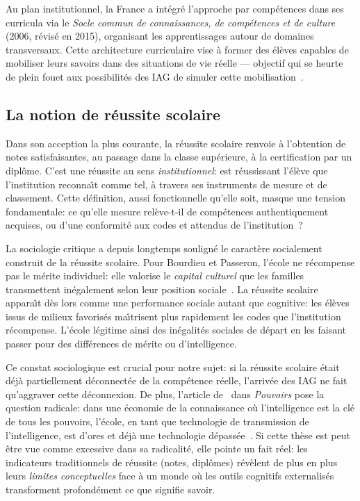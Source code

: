 Au plan institutionnel, la France a int\'egr\'e l'approche par comp\'etences dans ses curricula via le \emph{Socle commun de connaissances, de comp\'etences et de culture} (2006, r\'evis\'e en 2015), organisant les apprentissages autour de domaines transversaux. 
Cette architecture curriculaire vise \`a former des \'el\`eves capables de mobiliser leurs savoirs dans des situations de vie r\'eelle --- objectif qui se heurte de plein fouet aux possibilit\'es des IAG de simuler cette mobilisation~\citep{leroux2015evaluer}.

\subsection{La notion de r\'eussite scolaire}

Dans son acception la plus courante, la r\'eussite scolaire renvoie \`a l'obtention de notes satisfaisantes, au passage dans la classe sup\'erieure, \`a la certification par un dipl\^ome.
C'est une r\'eussite au sens \emph{institutionnel}: est r\'eussissant l'\'el\`eve que l'institution reconna\^\i t comme tel, \`a travers ses instruments de mesure et de classement.
Cette d\'efinition, aussi fonctionnelle qu'elle soit, masque une tension fondamentale: ce qu'elle mesure rel\`eve-t-il de comp\'etences authentiquement acquises, ou d'une conformit\'e aux codes et attendus de l'institution~?

La sociologie critique a depuis longtemps soulign\'e le caract\`ere socialement construit de la r\'eussite scolaire. 
Pour Bourdieu et Passeron, l'\'ecole ne r\'ecompense pas le m\'erite individuel: elle valorise le \emph{capital culturel} que les familles transmettent in\'egalement selon leur position sociale~\citep{pluet1971pierre}. 
La r\'eussite scolaire appara\^\i t d\`es lors comme une performance sociale autant que cognitive: les \'el\`eves issus de milieux favoris\'es ma\^\i trisent plus rapidement les codes que l'institution r\'ecompense. 
L'\'ecole l\'egitime ainsi des in\'egalit\'es sociales de d\'epart en les faisant passer pour des diff\'erences de m\'erite ou d'intelligence.

Ce constat sociologique est crucial pour notre sujet: si la r\'eussite scolaire \'etait d\'ej\`a partiellement d\'econnect\'ee de la comp\'etence r\'eelle, l'arriv\'ee des IAG ne fait qu'aggraver cette d\'econnexion. 
De plus, l'article de~\cite{alexandre2019ia} dans \emph{Pouvoirs} pose la question radicale: dans une \og{}\'economie de la connaissance\fg{} o\`u l'intelligence est la cl\'e de tous les pouvoirs, l'\'ecole, \og{}en tant que technologie de transmission de l'intelligence, est d'ores et d\'ej\`a une technologie d\'epass\'ee\fg{}~\citep{alexandre2019ia}.
Si cette th\`ese est peut \^etre vue comme excessive dans sa radicalit\'e, elle pointe un fait r\'eel: les indicateurs traditionnels de r\'eussite (notes, dipl\^omes) r\'ev\`elent de plus en plus leurs \emph{limites conceptuelles} face \`a un monde o\`u les outils cognitifs externalis\'es transforment profond\'ement ce que signifie \og{}savoir\fg{}.

